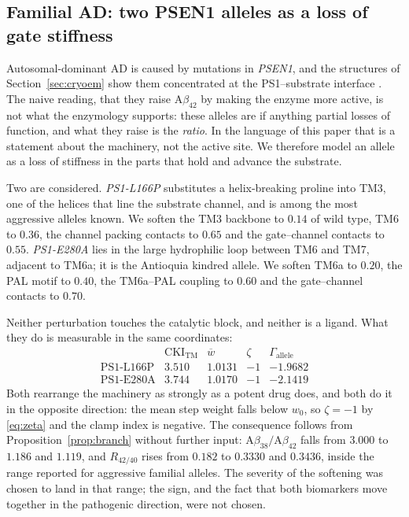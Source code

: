 \documentclass[11pt,reqno]{amsart}
\theoremstyle{plain}
\theoremstyle{definition}
\theoremstyle{remark}
\numberwithin{equation}{section}
\newcommand{\CKI}{\mathrm{CKI}}
\newcommand{\CKItm}{\CKI_{\mathrm{TM}}}
\newcommand{\Ab}{\mathrm{A}\beta}
\begin{document}
\subsection{Familial AD: two PSEN1 alleles as a loss of gate stiffness}
\label{sec:fad}
Autosomal-dominant AD is caused by mutations in \emph{PSEN1}, and the structures of Section~\ref{sec:cryoem} show them concentrated at the PS1--substrate interface \cite{Zhou2019}. The naive reading, that they raise $\Ab_{42}$ by making the enzyme more active, is not what the enzymology supports: these alleles are if anything partial losses of function, and what they raise is the \emph{ratio}. In the language of this paper that is a statement about the machinery, not the active site. We therefore model an allele as a loss of stiffness in the parts that hold and advance the substrate.

Two are considered. \emph{PS1-L166P} substitutes a helix-breaking proline into TM3, one of the helices that line the substrate channel, and is among the most aggressive alleles known. We soften the TM3 backbone to $0.14$ of wild type, TM6 to $0.36$, the channel packing contacts to $0.65$ and the gate--channel contacts to $0.55$. \emph{PS1-E280A} lies in the large hydrophilic loop between TM6 and TM7, adjacent to TM6a; it is the Antioquia kindred allele. We soften TM6a to $0.20$, the PAL motif to $0.40$, the TM6a--PAL coupling to $0.60$ and the gate--channel contacts to $0.70$.

Neither perturbation touches the catalytic block, and neither is a ligand. What they do is measurable in the same coordinates:
\[
\begin{array}{lcccc}
 & \CKItm & \overline{w} & \zeta & \Gamma_{\text{allele}}\\[2pt]
\text{PS1-L166P} & 3.510 & 1.0131 & -1 & -1.9682\\
\text{PS1-E280A} & 3.744 & 1.0170 & -1 & -2.1419
\end{array}
\]
Both rearrange the machinery as strongly as a potent drug does, and both do it in the opposite direction: the mean step weight falls below $w_0$, so $\zeta=-1$ by \eqref{eq:zeta} and the clamp index is negative. The consequence follows from Proposition~\ref{prop:branch} without further input: $\Ab_{38}/\Ab_{42}$ falls from $3.000$ to $1.186$ and $1.119$, and $R_{42/40}$ rises from $0.182$ to $0.3330$ and $0.3436$, inside the range reported for aggressive familial alleles. The severity of the softening was chosen to land in that range; the sign, and the fact that both biomarkers move together in the pathogenic direction, were not chosen.
\end{document}
